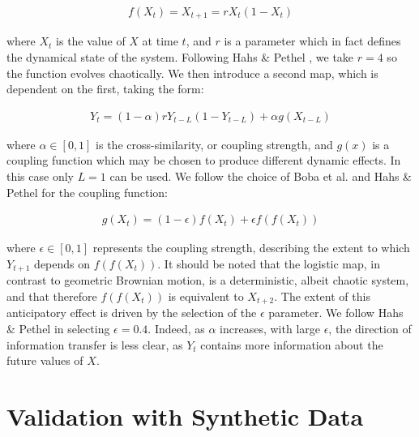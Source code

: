 \documentclass[]{rsos}%
\begin{document}
{  \begin{eqnarray}
    f(X_t) = X_{t+1} = rX_t(1-X_t)    
    \label{eq:f(x)}
  \end{eqnarray}

  where $X_t$ is the value of $X$ at time $t$, and $r$ is a parameter which in fact defines the dynamical state of the system. Following Hahs \& Pethel \cite{hahs2011distinguishing}, we take $r=4$ so the function evolves chaotically. We then introduce a second map, which is dependent on the first, taking the form:

  \begin{eqnarray}
    Y_{t} = (1-\alpha) rY_{t-L}(1-Y_{t-L})  + \alpha g(X_{t-L})   
    \label{eq:coupled_map}
  \end{eqnarray}

  where $ \alpha \in [0,1]$ is the cross-similarity, or coupling strength, and $g(x)$ is a coupling function which may be chosen to produce different dynamic effects. In this case only $L=1$ can be used. We follow the choice of Boba et al. \cite{boba2015efficient} and Hahs \& Pethel \cite{hahs2011distinguishing} for the coupling function:

  \begin{eqnarray}
    g(X_t) = (1-\epsilon) f(X_t) + \epsilon f(f(X_t)) 
    \label{eq:g(x)}
  \end{eqnarray}


 where $\epsilon \in [0,1]$ represents the coupling strength, describing the extent to which $Y_{t+1}$ depends on $f(f(X_t))$. It should be noted that the logistic map, in contrast to geometric Brownian motion, is a deterministic, albeit chaotic system, and that therefore $f(f(X_t))$ is equivalent to $X_{t+2}$. The extent of this anticipatory effect is driven by the selection of the $\epsilon$ parameter. We follow Hahs \& Pethel in selecting $\epsilon=0.4$. Indeed, as $\alpha$ increases, with large $\epsilon$, the direction of information transfer is less clear, as $Y_t$ contains more information about the future values of $X$.



\section{Validation with Synthetic Data} \label{s.validation}

}
\end{document}
